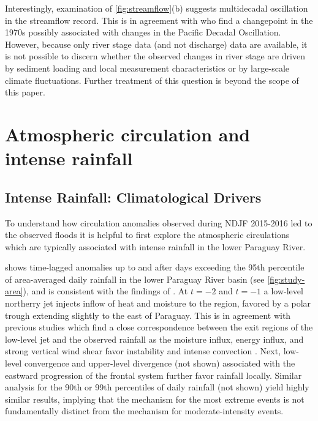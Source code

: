 \documentclass[twocol]{ametsoc}
\begin{document}
Interestingly, examination of \cref{fig:streamflow}(b) suggests multidecadal oscillation in the streamflow record.
This is in agreement with \citet{Collischonn:2001bi,Carvalho2011} who find a changepoint in the 1970s possibly associated with changes in the Pacific Decadal Oscillation.
However, because only river stage data (and not discharge) data are available, it is not possible to discern whether the observed changes in river stage are driven by sediment loading and local measurement characteristics or by large-scale climate fluctuations. Further treatment of this question is beyond the scope of this paper.


\section{Atmospheric circulation and intense rainfall} \label{sec:diagnostics}

\subsection{Intense Rainfall: Climatological Drivers} \label{sec:rainfall-circulation}

To understand how circulation anomalies observed during NDJF 2015-2016 led to the observed floods it is helpful to first explore the atmospheric circulations which are typically associated with intense rainfall in the lower Paraguay River.

 shows time-lagged anomalies up to and after days exceeding the 95th percentile of area-averaged daily rainfall in the lower Paraguay River basin (see \cref{fig:study-area}), and is consistent with the findings of \citet{Marengo2004,Salio:2007gd}.
At $t=-2$ and $t=-1$ a low-level northerry jet injects inflow of heat and moisture to the region, favored by a polar trough extending slightly to the east of Paraguay.
This is in agreement with previous studies which find a close correspondence between the exit regions of the low-level jet and the observed rainfall \citep{Saulo:2007km,Salio:2007gd,Marengo2004,Velasco1987} as the moisture influx, energy influx, and strong vertical wind shear favor instability and intense convection \citep{Marengo2004,Silva2009}.
Next, low-level convergence and upper-level divergence (not shown) associated with the eastward progression of the frontal system further favor rainfall locally.
Similar analysis for the 90th or 99th percentiles of daily rainfall (not shown) yield highly similar results, implying that the mechanism for the most extreme events is not fundamentally distinct from the mechanism for moderate-intensity events.
\end{document}
